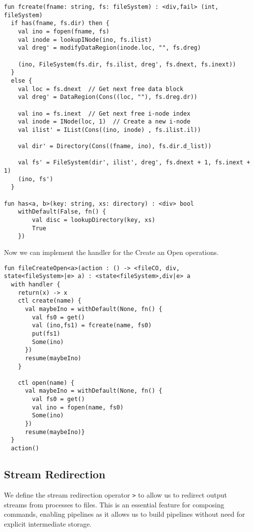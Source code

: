 \documentclass[logo,bsc,singlespacing,parskip]{infthesis}
\begin{document}
\begin{lstlisting}
fun fcreate(fname: string, fs: fileSystem) : <div,fail> (int, fileSystem) 
  if has(fname, fs.dir) then {
    val ino = fopen(fname, fs)  
    val inode = lookupINode(ino, fs.ilist)  
    val dreg' = modifyDataRegion(inode.loc, "", fs.dreg)  

    (ino, FileSystem(fs.dir, fs.ilist, dreg', fs.dnext, fs.inext))  
  }
  else {
    val loc = fs.dnext  // Get next free data block
    val dreg' = DataRegion(Cons((loc, ""), fs.dreg.dr))  

    val ino = fs.inext  // Get next free i-node index
    val inode = INode(loc, 1)  // Create a new i-node
    val ilist' = IList(Cons((ino, inode) , fs.ilist.il))  

    val dir' = Directory(Cons((fname, ino), fs.dir.d_list))  

    val fs' = FileSystem(dir', ilist', dreg', fs.dnext + 1, fs.inext + 1)  
    (ino, fs')
  }

fun has<a, b>(key: string, xs: directory) : <div> bool
    withDefault(False, fn() {
        val disc = lookupDirectory(key, xs)  
        True  
    })
\end{lstlisting}

Now we can implement the handler for the Create an Open operations.

\begin{lstlisting}
fun fileCreateOpen<a>(action : () -> <fileCO, div, state<fileSystem>|e> a) : <state<fileSystem>,div|e> a
  with handler {
    return(x) -> x
    ctl create(name) {
      val maybeIno = withDefault(None, fn() {
        val fs0 = get()
        val (ino,fs1) = fcreate(name, fs0)
        put(fs1)
        Some(ino)
      })
      resume(maybeIno)
    }

    ctl open(name) {
      val maybeIno = withDefault(None, fn() {
        val fs0 = get()
        val ino = fopen(name, fs0)
        Some(ino)
      })
      resume(maybeIno)}  
  }
  action()
\end{lstlisting}

\subsection*{Stream Redirection}
We define the stream redirection operator \texttt{>} to allow us to redirect output streams from processes to files. This is an essential feature for composing commands, enabling pipelines as it allows us to build pipelines without need for explicit intermediate storage.
\end{document}
